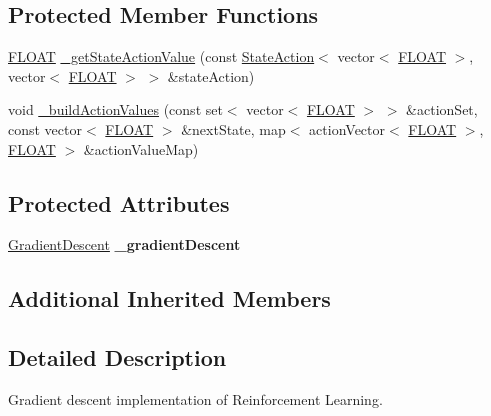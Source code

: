\subsection*{Protected Member Functions}
\begin{DoxyCompactItemize}
\item 
\hyperlink{namespaceAI_a41b74884a20833db653dded3918e05c3}{F\+L\+O\+A\+T} \hyperlink{classAI_1_1Algorithm_1_1ReinforcementLearningGD_ae03c74aee807bbf220c7e330666e3318}{\+\_\+get\+State\+Action\+Value} (const \hyperlink{classAI_1_1StateAction}{State\+Action}$<$ vector$<$ \hyperlink{namespaceAI_a41b74884a20833db653dded3918e05c3}{F\+L\+O\+A\+T} $>$, vector$<$ \hyperlink{namespaceAI_a41b74884a20833db653dded3918e05c3}{F\+L\+O\+A\+T} $>$ $>$ \&state\+Action)
\item 
void \hyperlink{classAI_1_1Algorithm_1_1ReinforcementLearningGD_a37eb184f5219dce30af3f60f1835999e}{\+\_\+build\+Action\+Values} (const set$<$ vector$<$ \hyperlink{namespaceAI_a41b74884a20833db653dded3918e05c3}{F\+L\+O\+A\+T} $>$ $>$ \&action\+Set, const vector$<$ \hyperlink{namespaceAI_a41b74884a20833db653dded3918e05c3}{F\+L\+O\+A\+T} $>$ \&next\+State, map$<$ action\+Vector$<$ \hyperlink{namespaceAI_a41b74884a20833db653dded3918e05c3}{F\+L\+O\+A\+T} $>$, \hyperlink{namespaceAI_a41b74884a20833db653dded3918e05c3}{F\+L\+O\+A\+T} $>$ \&action\+Value\+Map)
\end{DoxyCompactItemize}
\subsection*{Protected Attributes}
\begin{DoxyCompactItemize}
\item 
\hypertarget{classAI_1_1Algorithm_1_1ReinforcementLearningGD_a881c614b3deb26f39683386a72b76dda}{\hyperlink{classAI_1_1Algorithm_1_1GradientDescent}{Gradient\+Descent} {\bfseries \+\_\+gradient\+Descent}}\label{classAI_1_1Algorithm_1_1ReinforcementLearningGD_a881c614b3deb26f39683386a72b76dda}

\end{DoxyCompactItemize}
\subsection*{Additional Inherited Members}


\subsection{Detailed Description}
Gradient descent implementation of Reinforcement Learning. 

